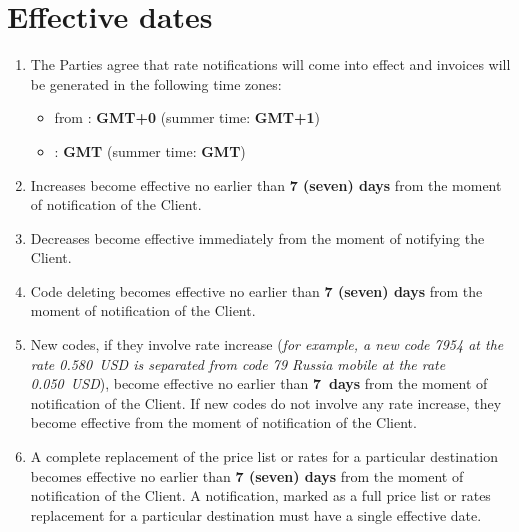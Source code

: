 \begin{Form}
\begin{enumerate}[label=\thesection.\arabic*.]
  \end{enumerate}


\section{Effective dates}

  \begin{enumerate}[label=\thesection.\arabic*.]
  \item The Parties agree that rate notifications will come into effect and invoices will be generated in the following time zones:
      \begin{itemize}
        \item from \textbf{\ipxpname}: \textbf{GMT+0} (summer time: \textbf{GMT+1})
        \item {}
                {\underline{\TextField[name=clntname,charsize=10pt,width=22em,height=1em,borderwidth=0, bordercolor={1 1 1}, default=Company name]{}}:}
                 \textbf{GMT}\underline{\TextField[name=clntgmt,charsize=10pt,width=3em,maxlen=3,height=1em,borderwidth=0,bordercolor={1 1 1}]{}}
         (summer time: \textbf{GMT}\underline{\TextField[name=clntgmtsummer,charsize=10pt,width=3em,maxlen=3,height=1em,borderwidth=0,bordercolor={1 1 1}]{}})
      \end{itemize}
  \item Increases become effective no earlier than \textbf{7 (seven) days} from the moment of notification of the Client.
  \item Decreases become effective immediately from the moment of notifying the Client.
  \item Code deleting becomes effective no earlier than \textbf{7 (seven) days} from the moment of notification of the Client.
  \item New codes, if they involve rate increase (\textit{for example, a new code 7954
    at the rate 0.580~USD is separated from code 79 Russia mobile at the rate 0.050~USD}),
    become effective no earlier than \textbf{7~days} from the moment of notification of the Client.
    If new codes do not involve any rate increase, they become effective from the moment of notification of the Client.
  \item A complete replacement of the price list or rates for a particular destination
        becomes effective no earlier than \textbf{7 (seven) days} from the moment of notification of the Client.
        A notification, marked as a full price list or rates replacement for a particular
        destination must have a single effective date.

\end{enumerate}
\end{Form}
